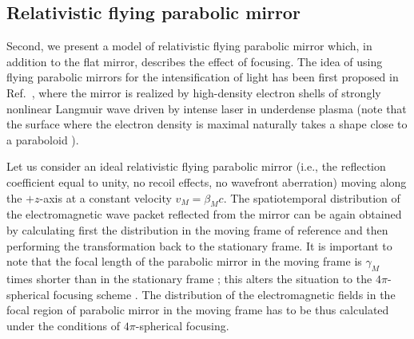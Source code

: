 \documentclass[10pt, a4paper, twoside, openright]{report}
\begin{document}
\subsection{Relativistic flying parabolic mirror\label{sec:rfpm}}


Second, we present a model of relativistic flying parabolic mirror which, in addition to the flat mirror, describes the effect of focusing. The idea of using flying parabolic mirrors for the intensification of light has been first proposed in Ref.~, where the mirror is realized by high-density electron shells of strongly nonlinear Langmuir wave driven by intense laser in underdense plasma (note that the surface where the electron density is maximal naturally takes a shape close to a paraboloid \cite{Bulanov1991, Bulanov1995, Matlis2006, Shadwick2002, Maksimchuk2008}).

Let us consider an ideal relativistic flying parabolic mirror (i.e., the reflection coefficient equal to unity, no recoil effects, no wavefront aberration) moving along the $ +z $-axis at a constant velocity $ v_M = \beta_M c $. The spatiotemporal distribution of the electromagnetic wave packet reflected from the mirror can be again obtained by calculating first the distribution in the moving frame of reference and then performing the transformation back to the stationary frame. It is important to note that the focal length of the parabolic mirror in the moving frame is $ \gamma_M $ times shorter than in the stationary frame \cite{Bulanov2011, Jeong2021}; this alters the situation to the $ 4 \pi $-spherical focusing scheme \cite{Gonoskov2012, Jeong2020}. The distribution of the electromagnetic fields in the focal region of parabolic mirror in the moving frame has to be thus calculated under the conditions of $ 4 \pi $-spherical focusing.
\end{document}
